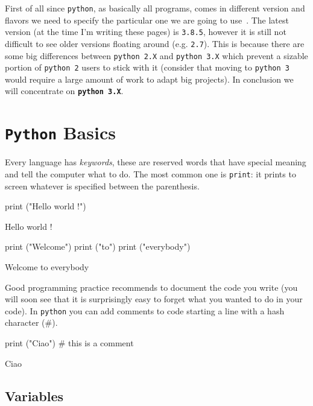 First of all since \texttt{python}, as basically all programs, comes in different version and flavors we need to specify the particular one we are going to use~\cite{python_versions}.
The latest version (at the time I'm writing these pages) is \texttt{3.8.5}, however it is still not difficult to see older versions floating around (e.g. \texttt{2.7}).
This is because there are some big differences between \texttt{python 2.X} and \texttt{python 3.X} which prevent a sizable portion of \texttt{python 2} users to stick with it (consider that moving to \texttt{python 3} would require a large amount of work to adapt big projects).
In conclusion we will concentrate on \textbf{\texttt{python~3.X}}.

\section{\texttt{Python} Basics}
\label{python-basics}

Every language has \emph{keywords}, these are reserved words that have special meaning and tell the computer what to do. The most common one is \texttt{print}: it prints to screen whatever is specified between the parenthesis.
	
\begin{ipythonnon}
print ("Hello world !")
\end{ipythonnon}
\begin{ioutput}
Hello world !
\end{ioutput}
\begin{ipythonnon}
print ("Welcome")
print ("to")
print ("everybody")
\end{ipythonnon}
\begin{ioutput}
Welcome
to
everybody
\end{ioutput}

Good programming practice recommends to document the code you write (you will soon see that it is surprisingly easy to forget what you wanted to do in your code). In \texttt{python} you can add comments to code starting a line with a hash character (\#).

\begin{ipythonnon}
print ("Ciao") # this is a comment 
\end{ipythonnon}
\begin{ioutput}
Ciao
\end{ioutput}

\subsection{Variables}\label{variables}

